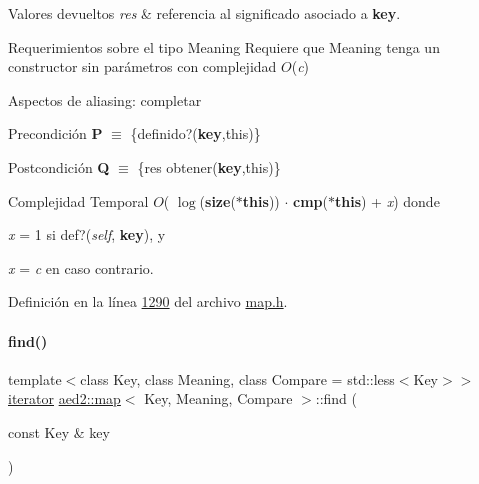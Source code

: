 \begin{DoxyRetVals}{Valores devueltos}
{\em res} & referencia al significado asociado a {\bfseries key}.\\
\hline
\end{DoxyRetVals}
\begin{DoxyParagraph}{Requerimientos sobre el tipo Meaning}
Requiere que Meaning tenga un constructor sin parámetros con complejidad $O$({\itshape c})
\end{DoxyParagraph}
\begin{DoxyParagraph}{Aspectos de aliasing\+:}
completar
\end{DoxyParagraph}
\begin{DoxyPrecond}{Precondición}
{\bfseries P} $\equiv$ \{definido?({\bfseries key},this)\} 
\end{DoxyPrecond}
\begin{DoxyPostcond}{Postcondición}
{\bfseries Q} $\equiv$ \{res  obtener({\bfseries key},this)\}
\end{DoxyPostcond}

\begin{DoxyDescription}
\item[Complejidad Temporal]$O$( $\log$({\bfseries size}({\bfseries $\ast$this})) $\cdot$ {\bfseries cmp}({\bfseries $\ast$this}) + {\itshape x}) donde
\begin{DoxyItemize}
\item {\itshape x} = 1 si def?({\itshape self}, {\bfseries key}), y
\item {\itshape x} = {\itshape c} en caso contrario.
\end{DoxyItemize}
\end{DoxyDescription}

Definición en la línea \hyperlink{map_8h_source_l01290}{1290} del archivo \hyperlink{map_8h_source}{map.\+h}.

\mbox{\label{classaed2_1_1map_afd0fc1a8234888e61e0e615de7e245b8_afd0fc1a8234888e61e0e615de7e245b8}} 
\paragraph{\texorpdfstring{find()}{find()}\hspace{0.1cm}{\footnotesize\ttfamily [1/2]}}
{\footnotesize\ttfamily template$<$class Key, class Meaning, class Compare = std\+::less$<$\+Key$>$$>$ \\
\hyperlink{classaed2_1_1map_1_1iterator}{iterator} \hyperlink{classaed2_1_1map}{aed2\+::map}$<$ Key, Meaning, Compare $>$\+::find (\begin{DoxyParamCaption}\item[{const Key \&}]{key }\end{DoxyParamCaption})\hspace{0.3cm}{\ttfamily [inline]}}



